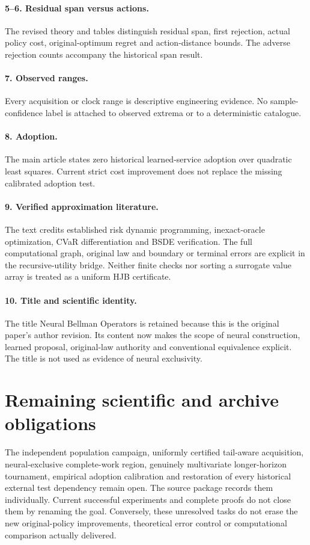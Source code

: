 \documentclass[11pt]{article}
\begin{document}
\paragraph{5--6. Residual span versus actions.}
The revised theory and tables distinguish residual span, first rejection, actual policy cost, original-optimum regret and action-distance bounds. The adverse rejection counts accompany the historical span result.
\paragraph{7. Observed ranges.}
Every acquisition or clock range is descriptive engineering evidence. No sample-confidence label is attached to observed extrema or to a deterministic catalogue.
\paragraph{8. Adoption.}
The main article states zero historical learned-service adoption over quadratic least squares. Current strict cost improvement does not replace the missing calibrated adoption test.
\paragraph{9. Verified approximation literature.}
The text credits established risk dynamic programming, inexact-oracle optimization, CVaR differentiation and BSDE verification. The full computational graph, original law and boundary or terminal errors are explicit in the recursive-utility bridge. Neither finite checks nor sorting a surrogate value array is treated as a uniform HJB certificate.
\paragraph{10. Title and scientific identity.}
The title Neural Bellman Operators is retained because this is the original paper's author revision. Its content now makes the scope of neural construction, learned proposal, original-law authority and conventional equivalence explicit. The title is not used as evidence of neural exclusivity.

\section*{Remaining scientific and archive obligations}
The independent population campaign, uniformly certified tail-aware acquisition, neural-exclusive complete-work region, genuinely multivariate longer-horizon tournament, empirical adoption calibration and restoration of every historical external test dependency remain open. The source package records them individually. Current successful experiments and complete proofs do not close them by renaming the goal. Conversely, these unresolved tasks do not erase the new original-policy improvements, theoretical error control or computational comparison actually delivered.
\end{document}
